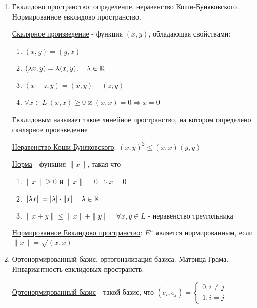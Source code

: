 \documentclass[12pt]{article}
\begin{document}
    \begin{enumerate}
        \item Евклидово пространство: определение, неравенство Коши-Буняковского. Нормированное евклидово пространство.

        \hyperlink{scalarproductdefinition}{Скалярное произведение} - функция $(x, y)$, обладающая свойствами:

        \begin{enumerate}
            \item $(x, y) = (y, x)$
            \item $(\lambda x, y) = \lambda (x, y), \quad \lambda \in \mathbb{R}$
            \item $(x + z, y) = (x, y) + (z, y)$
            \item $\forall x \in L\ (x, x) \geq 0$ и $(x, x) = 0 \Longrightarrow x = 0$
        \end{enumerate}

        \hyperlink{euclidspacedefinition}{Евклидовым} называет такое линейное пространство, на котором определено скалярное произведение

        \hyperlink{inequalityofCauchyBunyakovsky}{Неравенство Коши-Буняковского}: $(x, y)^2 \leq (x, x)(y, y)$

        \hyperlink{normdefinition}{Норма} - функция $\|x\|$, такая что

        \begin{enumerate}
            \item $\|x\| \geq 0$ и $\|x\| = 0 \Longrightarrow x = 0$
            \item $\|\lambda x\| = |\lambda| \cdot \|x\| \quad \lambda \in \mathbb{R}$
            \item $\|x + y\| \leq \|x\| + \|y\| \quad \forall x, y \in L$ - неравенство треугольника
        \end{enumerate}

        \hyperlink{normalizedeuclidspace}{Нормированное Евклидово пространство}: $E^n$ является нормированным, если $\|x\| = \sqrt{(x, x)}$

        \item Ортонормированный базис, ортогонализация базиса. Матрица Грама. Инвариантность евклидовых пространств.

        \hyperlink{ortonormalizedbasis}{Ортонормированный базис} - такой базис, что $(e_i, e_j) = \begin{cases}
                                                                                                      0, i \neq j \\ 1, i = j
        \end{cases}$


\end{enumerate}
\end{document}
